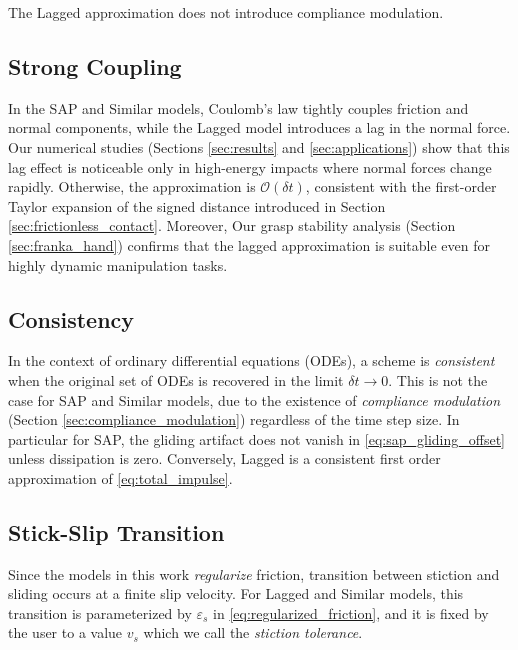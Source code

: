 The Lagged approximation does not introduce compliance modulation.

\subsection{Strong Coupling}
\label{sec:strong_coupling}

In the SAP and Similar models, Coulomb's law tightly couples friction and normal
components, while the Lagged model introduces a lag in the normal force. Our
numerical studies (Sections \ref{sec:results} and \ref{sec:applications}) show
that this lag effect is noticeable only in high-energy impacts where normal
forces change rapidly. Otherwise, the approximation is $\mathcal{O}(\delta t)$,
consistent with the first-order Taylor expansion of the signed distance
introduced in Section \ref{sec:frictionless_contact}. Moreover, Our grasp
stability analysis (Section \ref{sec:franka_hand}) confirms that the lagged
approximation is suitable even for highly dynamic manipulation tasks.

\subsection{Consistency}
\label{sec:consistency}

In the context of ordinary differential equations (ODEs), a scheme is
\emph{consistent} when the original set of ODEs is recovered in the limit $\delta
t\rightarrow 0$. This is not the case for SAP and Similar models, due to the
existence of \emph{compliance modulation} (Section
\ref{sec:compliance_modulation}) regardless of the time step size. In particular
for SAP, the gliding artifact does not vanish in \eqref{eq:sap_gliding_offset}
unless dissipation is zero. Conversely, Lagged is a consistent first order
approximation of \eqref{eq:total_impulse}.

\subsection{Stick-Slip Transition}
\label{sec:stiction_tolerance}

Since the models in this work \emph{regularize} friction, transition
between stiction and sliding occurs at a finite slip velocity. For Lagged and
Similar models, this transition is parameterized by $\varepsilon_s$ in
\eqref{eq:regularized_friction}, and it is fixed by the user to a value $v_s$
which we call the \emph{stiction tolerance}.

